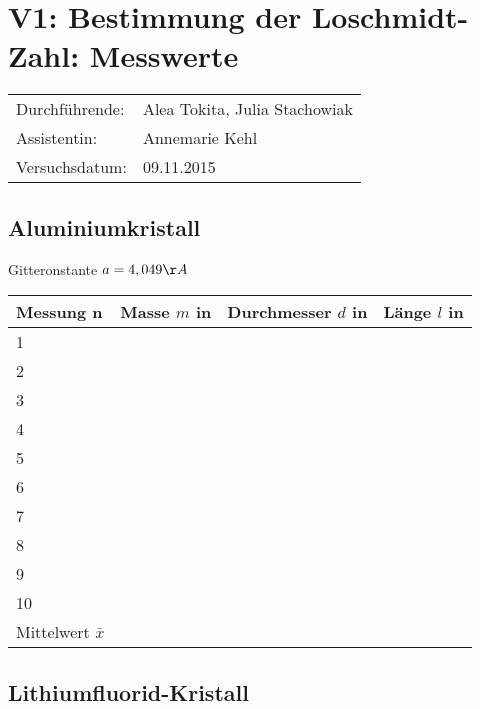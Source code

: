 \documentclass[11pt,a4paper,titlepage,headinclude,bibtotoc]{scrartcl}
\begin{document}
\centering

\section*{V1: Bestimmung der Loschmidt- Zahl: Messwerte}

\begin{flushleft}
\begin{Large}
\begin{tabular}{ll}
Durchführende: &  Alea Tokita, Julia Stachowiak\\
Assistentin: & Annemarie Kehl\\
 Versuchsdatum: & 09.11.2015\\
\end{tabular}
\end{Large}
\end{flushleft}


\subsection*{Aluminiumkristall}

Gitteronstante $a= 4,049\AA$

\begin{table} [h]
\centering
\begin{tabular}{|p{3 cm}||p{3 cm}|p{3 cm}|p{3 cm}|}
        \hline
		Messung n& Masse $m$ in & Durchmesser $d$ in & Länge $l$ in\\
         \hline 
         1& & &\\
          \hline 
         2& & &\\
          \hline 
         3& & &\\
          \hline 
         4& & &\\
          \hline 
         5& & &\\
          \hline 
         6& & &\\
          \hline 
         7& & &\\
          \hline 
         8& & &\\
          \hline 
         9& & &\\
          \hline 
         10& & &\\
         \hline
         Mittelwert $\bar{x}$ & & &\\
         \hline
\end{tabular}
\end{table}

\subsection*{Lithiumfluorid-Kristall}
\end{document}
